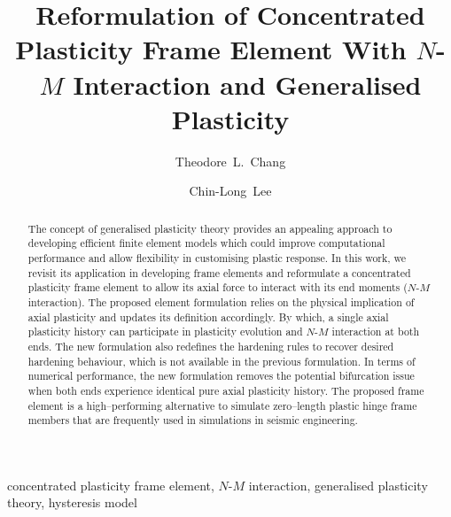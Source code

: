 \documentclass[3p,authoryear,11pt,fleqn,review]{elsarticle}
\begin{document}
\linenumbers
\begin{abstract}
\begin{linenumbers}
The concept of generalised plasticity theory provides an appealing approach to developing efficient finite element models which could improve computational performance and allow flexibility in customising plastic response.
In this work, we revisit its application in developing frame elements and reformulate a concentrated plasticity frame element to allow its axial force to interact with its end moments ($N$-$M$ interaction).
The proposed element formulation relies on the physical implication of axial plasticity and updates its definition accordingly.
By which, a single axial plasticity history can participate in plasticity evolution and $N$-$M$ interaction at both ends.
The new formulation also redefines the hardening rules to recover desired hardening behaviour, which is not available in the previous formulation.
In terms of numerical performance, the new formulation removes the potential bifurcation issue when both ends experience identical pure axial plasticity history.
The proposed frame element is a high--performing alternative to simulate zero--length plastic hinge frame members that are frequently used in simulations in seismic engineering.
\end{linenumbers}
\end{abstract}
\begin{keyword}
concentrated plasticity frame element\sep
$N$-$M$ interaction\sep
generalised plasticity theory\sep
hysteresis model
\end{keyword}
\begin{frontmatter}
\title{Reformulation of Concentrated Plasticity Frame Element With $N$-$M$ Interaction and Generalised Plasticity}
\author[add1]{Theodore~L.~Chang}
\author[add2]{Chin-Long~Lee}
\address[add1]{IRIS Adlershof, Humboldt-Universität zu Berlin, Berlin, Germany, 12489.}
\address[add2]{Department of Civil and Natural Resources Engineering, University of Canterbury, Christchurch, New Zealand, 8041.}
\end{frontmatter}




\clearpage
\end{document}
